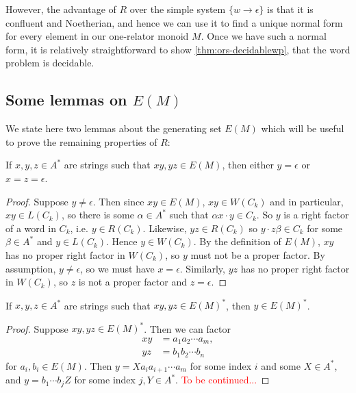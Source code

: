\documentclass[libertine,widepage,nosubthm]{lmaths}
\begin{document}
However, the advantage of $R$ over the simple system $\{w \to \epsilon\}$ is that it is confluent and Noetherian, and hence we can use it to find a unique normal form for every element in our one-relator monoid $M$. Once we have such a normal form, it is relatively straightforward to show \cref{thm:ors-decidablewp}, that the word problem is decidable.

\subsection{Some lemmas on $E(M)$}

We state here two lemmas about the generating set $E(M)$ which will be useful to prove the remaining properties of $R$:

\begin{lemma} \label{lma:no-middle-E(M)}
	If $x, y, z \in A^*$ are strings such that $xy, yz \in E(M)$, then either $y = \epsilon$ or $x = z = \epsilon$.
\end{lemma}
\begin{proof}
	Suppose $y \ne \epsilon$. Then since $xy \in E(M)$, $xy \in W(C_k)$ and in particular, $xy \in L(C_k)$, so there is some $\alpha \in A^*$ such that $\alpha x \cdot y \in C_k$. So $y$ is a right factor of a word in $C_k$, i.e. $y \in R(C_k)$. Likewise, $yz \in R(C_k)$ so $y \cdot z\beta \in C_k$ for some $\beta \in A^*$ and $y \in L(C_k)$. Hence $y \in W(C_k)$. By the definition of $E(M)$, $xy$ has no proper right factor in $W(C_k)$, so $y$ must not be a proper factor. By assumption, $y \ne \epsilon$, so we must have $x = \epsilon$. Similarly, $yz$ has no proper right factor in $W(C_k)$, so $z$ is not a proper factor and $z = \epsilon$.
\end{proof}

\begin{cly} \label{cly:middle-E(M)*}
	If $x, y, z \in A^*$ are strings such that $xy, yz \in E(M)^*$, then $y \in E(M)^*$.
\end{cly}
\begin{proof}
	Suppose $xy, yz \in E(M)^*$. Then we can factor
		\begin{align*}
			xy &= a_1 a_2 \cdots a_m, \\
			yz &= b_1 b_2 \cdots b_n
		\end{align*}
	for $a_i, b_i \in E(M)$. Then $y = X a_i a_{i+1} \cdots a_m$ for some index $i$ and some $X \in A^*$, and $y = b_1 \cdots b_j Z$ for some index $j, Y \in A^*$. \textcolor{red}{To be continued...}
\end{proof}
\end{document}
